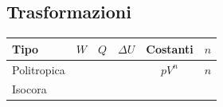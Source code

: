 \hypertarget{trasformazioni}{%
\subsection{Trasformazioni}\label{trasformazioni}}

\begin{longtable}[]{@{}lccccc@{}}
\toprule
\begin{minipage}[b]{0.07\columnwidth}\raggedright
Tipo\strut
\end{minipage} & \begin{minipage}[b]{0.13\columnwidth}\centering
\(W\)\strut
\end{minipage} & \begin{minipage}[b]{0.09\columnwidth}\centering
\(Q\)\strut
\end{minipage} & \begin{minipage}[b]{0.09\columnwidth}\centering
\(\Delta U\)\strut
\end{minipage} & \begin{minipage}[b]{0.39\columnwidth}\centering
Costanti\strut
\end{minipage} & \begin{minipage}[b]{0.05\columnwidth}\centering
\(n\)\strut
\end{minipage}\tabularnewline
\midrule
\endhead
\begin{minipage}[t]{0.07\columnwidth}\raggedright
Politropica\strut
\end{minipage} & \begin{minipage}[t]{0.13\columnwidth}\centering
\strut
\end{minipage} & \begin{minipage}[t]{0.09\columnwidth}\centering
\strut
\end{minipage} & \begin{minipage}[t]{0.09\columnwidth}\centering
\strut
\end{minipage} & \begin{minipage}[t]{0.39\columnwidth}\centering
\(pV^n\)\strut
\end{minipage} & \begin{minipage}[t]{0.05\columnwidth}\centering
\(n\)\strut
\end{minipage}\tabularnewline
\begin{minipage}[t]{0.07\columnwidth}\raggedright
Isocora\strut
\end{minipage} & \begin{minipage}[t]{0.13\columnwidth}\centering
0\strut
\end{minipage} & \begin{minipage}[t]{0.09\columnwidth}\centering

\end{minipage}
\end{longtable}
